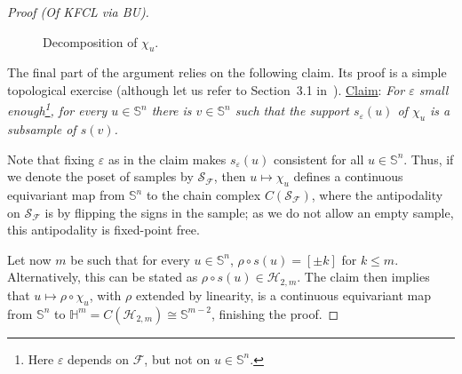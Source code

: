 \documentclass{article} %
\newcommand{\F}{\mathcal{F}}
\renewcommand{\H}{\mathcal{H}}
\renewcommand{\S}{\mathcal{S}}
\newcommand{\HH}{\mathbb{H}}
\renewcommand{\SS}{\mathbb{S}}
\begin{document}
\begin{proof}[Proof (Of KFCL via BU)]
\begin{figure}[hbt]
	    \caption{Decomposition of $\chi_u$.}
	    \label{fig-decomposition}
	\end{figure}
	
	The final part of the argument relies on the following claim. Its proof is a simple topological exercise (although let us refer to Section~3.1 in~\cite{chase2024local}). \underline{Claim}: \emph{For $\varepsilon$ small enough\footnote{Here $\varepsilon$ depends on $\F$, but not on $u\in \SS^n$.}, for every $u\in \SS^n$ there is $v\in \SS^n$ such that the support $s_\varepsilon(u)$ of $\chi_u$ is a subsample of $s(v)$.} 
	
	Note that fixing $\varepsilon$ as in the claim makes $s_\varepsilon(u)$ consistent for all $u\in \SS^n$. Thus, if we denote the poset of samples by $\S_\F$, then $u\mapsto \chi_u$ defines a continuous equivariant map from $\SS^n$ to the chain complex $C(\S_\F)$, where the antipodality on $\S_\F$ is by flipping the signs in the sample; as we do not allow an empty sample, this antipodality is fixed-point free. 
	
	Let now $m$ be such that for every $u\in \SS^n$, $\rho \circ s(u) =[\pm k]$ for $k\leq m$. Alternatively, this can be stated as $\rho \circ s(u)\in \H_{2, m}$. The claim then implies that $u\mapsto \rho \circ \chi_u$, with $\rho$ extended by linearity, is a continuous equivariant map from $\SS^n$ to $\HH^m = C(\H_{2,m}) \cong \SS^{m-2}$, finishing the proof.
\end{proof}
\end{document}
